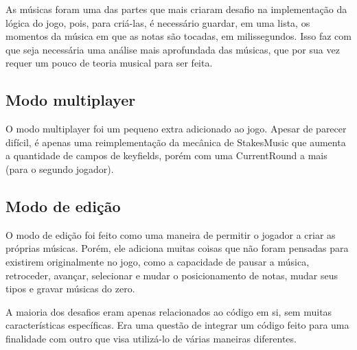     As músicas foram uma das partes que mais criaram desafio na implementação da lógica do jogo, pois, para criá-las, é necessário guardar, em uma lista, os momentos da música em que as notas são tocadas, em milissegundos. Isso faz com que seja necessária uma análise mais aprofundada das músicas, que por sua vez requer um pouco de teoria musical para ser feita.

    \subsection{Modo multiplayer}

    O modo multiplayer foi um pequeno extra adicionado ao jogo. Apesar de parecer difícil, é apenas uma reimplementação da mecânica de StakesMusic que aumenta a quantidade de campos de keyfields, porém com uma CurrentRound a mais (para o segundo jogador).

    \subsection{Modo de edição}

    O modo de edição foi feito como uma maneira de permitir o jogador a criar as próprias músicas. Porém, ele adiciona muitas coisas que não foram pensadas para existirem originalmente no jogo, como a capacidade de pausar a música, retroceder, avançar, selecionar e mudar o posicionamento de notas, mudar seus tipos e gravar músicas do zero.

    A maioria dos desafios eram apenas relacionados ao código em si, sem muitas características específicas. Era uma questão de integrar um código feito para uma finalidade com outro que visa utilizá-lo de várias maneiras diferentes.
    
